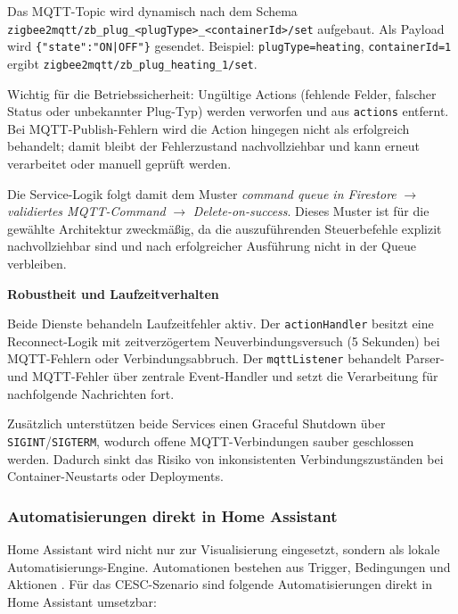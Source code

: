 Das MQTT-Topic wird dynamisch nach dem Schema \texttt{zigbee2mqtt/zb\_plug\_<plugType>\_<containerId>/set} aufgebaut. Als Payload wird \texttt{\{"state":"ON|OFF"\}} gesendet. Beispiel: \texttt{plugType=heating}, \texttt{containerId=1} ergibt \texttt{zigbee2mqtt/zb\_plug\_heating\_1/set}.

Wichtig für die Betriebssicherheit: Ungültige Actions (fehlende Felder, falscher Status oder unbekannter Plug-Typ) werden verworfen und aus \texttt{actions} entfernt. Bei MQTT-Publish-Fehlern wird die Action hingegen nicht als erfolgreich behandelt; damit bleibt der Fehlerzustand nachvollziehbar und kann erneut verarbeitet oder manuell geprüft werden.

Die Service-Logik folgt damit dem Muster \textit{command queue in Firestore} $\rightarrow$ \textit{validiertes MQTT-Command} $\rightarrow$ \textit{Delete-on-success}. Dieses Muster ist für die gewählte Architektur zweckmäßig, da die auszuführenden Steuerbefehle explizit nachvollziehbar sind und nach erfolgreicher Ausführung nicht in der Queue verbleiben.

\textbf{Robustheit und Laufzeitverhalten}


Beide Dienste behandeln Laufzeitfehler aktiv. Der \texttt{actionHandler} besitzt eine Reconnect-Logik mit zeitverzögertem Neuverbindungsversuch (5 Sekunden) bei MQTT-Fehlern oder Verbindungsabbruch. Der \texttt{mqttListener} behandelt Parser- und MQTT-Fehler über zentrale Event-Handler und setzt die Verarbeitung für nachfolgende Nachrichten fort.

Zusätzlich unterstützen beide Services einen Graceful Shutdown über \texttt{SIGINT}/\texttt{SIGTERM}, wodurch offene MQTT-Verbindungen sauber geschlossen werden. Dadurch sinkt das Risiko von inkonsistenten Verbindungszuständen bei Container-Neustarts oder Deployments.

\subsubsection{Automatisierungen direkt in Home Assistant}

Home Assistant wird nicht nur zur Visualisierung eingesetzt, sondern als lokale Automatisierungs-Engine. Automationen bestehen aus Trigger, Bedingungen und Aktionen \cite{ha_automation_basics}. Für das CESC-Szenario sind folgende Automatisierungen direkt in Home Assistant umsetzbar:

